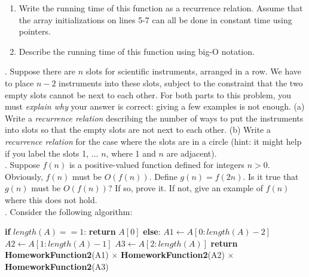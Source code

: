\documentclass[12pt]{article}
\begin{document}
\noindent
\begin{enumerate}
\item Write the running time of this function as a recurrence relation.  Assume that the array initializations on lines 5-7 can all be done in constant time using pointers.
\item Describe the running time of this function using big-O notation.\\
\end{enumerate}
 
.  Suppose there are $n$ slots for scientific instruments, arranged in a row.  We have to place $n - 2$ instruments into these slots, subject to the constraint that the two empty slots cannot be next to each other.  For both parts to this problem, you must \textit{explain why} your answer is correct: giving a few examples is not enough.  (a) Write a \textit{recurrence relation} describing the number of ways to put the instruments into slots so that the empty slots are not next to each other.  (b) Write a \textit{recurrence relation} for the case where the slots are in a circle (hint: it might help if you label the slots 1, ... $n$, where 1 and $n$ are adjacent).\\

.  Suppose $f(n)$ is a positive-valued function defined for integers $n > 0$.  Obviously, $f(n)$ must be $O(f(n))$. Define $g(n) = f(2n)$.  Is it true that $g(n)$ must be $O(f(n))$?  If so, prove it.  If not, give an example of $f(n)$ where this does not hold.\\ 

.  Consider the following algorithm: 
\begin{algorithm}
\begin{algorithmic}[1]
    \State \textbf{if} $length(A) == 1$:
    \State \hspace{0.8cm}  \textbf{return} $A[0]$
    \State \textbf{else}:
    \State \hspace{0.8cm} $A1\gets A[0:length(A)-2]$
    \State \hspace{0.8cm} $A2\gets A[1:length(A)-1]$
    \State \hspace{0.8cm} $A3\gets A[2:length(A)]$
    \State \hspace{0.8cm} \textbf{return HomeworkFunction2}(A1) $\times$ \textbf{HomeworkFunction2}(A2) $\times$ \textbf{HomeworkFunction2}(A3)
\EndFunction
\end{algorithmic}
\end{algorithm}
\end{document}
